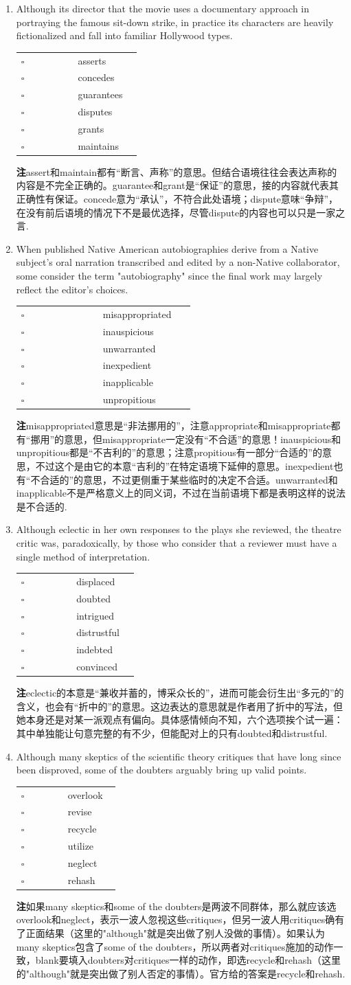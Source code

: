 \documentclass[11pt,space]{ctexart}
\newcommand{\note}[1]{{\heiti\textbf{注\hspace{1em}}}#1.}
\newcommand{\senequiv}[6]{
\begin{center}
\begin{tabularx}{\linewidth}{>{\raggedleft\arraybackslash}p{0.4\linewidth} p{0.45\linewidth}}
    $\square$ & {#1} \\
    $\square$ & {#2} \\
    $\square$ & {#3} \\
    $\square$ & {#4} \\
    $\square$ & {#5} \\
    $\square$ & {#6} \\
\end{tabularx}
\end{center}
}
\begin{document}
\begin{enumerate}

\item Although its director \blank{} that the movie uses a documentary approach in portraying the famous sit-down strike, in practice its characters are heavily fictionalized and fall into familiar Hollywood types.
\senequiv{asserts}{concedes}{guarantees}{disputes}{grants}{maintains}
\note{assert和maintain都有“断言、声称”的意思。但结合语境往往会表达声称的内容是不完全正确的。guarantee和grant是“保证”的意思，接的内容就代表其正确性有保证。concede意为“承认”，不符合此处语境；dispute意味“争辩”，在没有前后语境的情况下不是最优选择，尽管dispute的内容也可以只是一家之言}

\item When published Native American autobiographies derive from a Native subject's oral narration transcribed and edited by a non-Native collaborator, some consider the term "autobiography" \blank{} since the final work may largely reflect the editor's choices.
\senequiv{misappropriated}{inauspicious}{unwarranted}{inexpedient}{inapplicable}{unpropitious}
\note{misappropriated意思是“非法挪用的”，注意appropriate和misappropriate都有“挪用”的意思，但misappropriate一定没有“不合适”的意思！inauspicious和unpropitious都是“不吉利的”的意思；注意propitious有一部分“合适的”的意思，不过这个是由它的本意“吉利的”在特定语境下延伸的意思。inexpedient也有“不合适的”的意思，不过更侧重于某些临时的决定不合适。unwarranted和inapplicable不是严格意义上的同义词，不过在当前语境下都是表明这样的说法是不合适的}

\item Although eclectic in her own responses to the plays she reviewed, the theatre critic was, paradoxically, \blank{} by those who consider that a reviewer must have a single method of interpretation.
\senequiv{displaced}{doubted}{intrigued}{distrustful}{indebted}{convinced}
\note{eclectic的本意是“兼收并蓄的，博采众长的”，进而可能会衍生出“多元的”的含义，也会有“折中的”的意思。这边表达的意思就是作者用了折中的写法，但她本身还是对某一派观点有偏向。具体感情倾向不知，六个选项挨个试一遍：其中单独能让句意完整的有不少，但能配对上的只有doubted和distrustful}

\item Although many skeptics of the scientific theory \blank{} critiques that have long since been disproved, some of the doubters arguably bring up valid points.
\senequiv{overlook}{revise}{recycle}{utilize}{neglect}{rehash}
\note{如果many skeptics和some of the doubters是两波不同群体，那么就应该选overlook和neglect，表示一波人忽视这些critiques，但另一波人用critiques确有了正面结果（这里的"although"就是突出做了别人没做的事情）。如果认为many skeptics包含了some of the doubters，所以两者对critiques施加的动作一致，blank要填入doubters对critiques一样的动作，即选recycle和rehash（这里的"although"就是突出做了别人否定的事情）。官方给的答案是recycle和rehash}


\end{enumerate}
\end{document}
